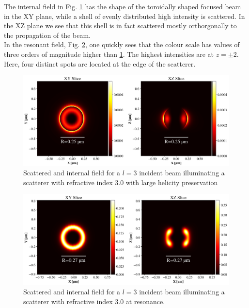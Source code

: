 The internal field in Fig. \ref{fig:scatfig1} has the shape of the toroidally shaped focused beam in the XY plane, while a shell of evenly distributed high intensity is scattered. In the XZ plane we see that this shell is in fact scattered mostly orthorgonally to the propagation of the beam.\\
In the resonant field, Fig. \ref{fig:scatfig2}, one quickly sees that the colour scale has values of three orders of magnitude higher than \ref{fig:scatfig1}. The highest intensities are at $z=\pm 2$. Here, four distinct spots are located at the edge of the scatterer.
\begin{figure}[ht]
    \centering
    \includegraphics[width=\textwidth]{Figures/scat_pres_l3.png} %
    \caption{Scattered and internal field for a $l=3$ incident beam illuminating a scatterer with refractive index $3.0$ with large helicity preservation}
    \label{fig:scatfig1}
\end{figure}

\begin{figure}[ht]
    \centering
    \includegraphics[width=\textwidth]{Figures/scat_res_l3.png} %
    \caption{Scattered and internal field for a $l=3$ incident beam illuminating a scatterer with refractive index $3.0$ at resonance.}
    \label{fig:scatfig2}
\end{figure}
